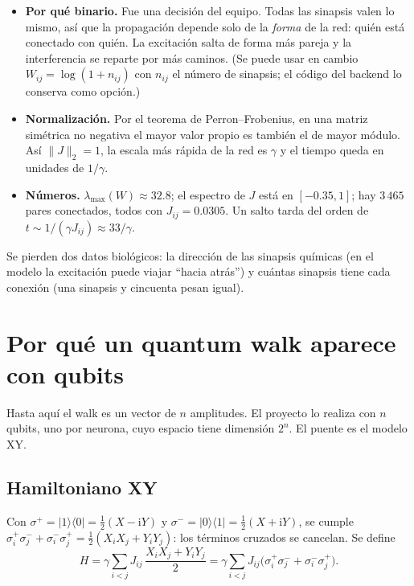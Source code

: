 \documentclass[11pt,a4paper]{article}
\renewcommand{\ket}[1]{\lvert #1\rangle}
\renewcommand{\bra}[1]{\langle #1\rvert}
\newcommand{\ii}{\mathrm{i}}
\theoremstyle{plain}
\theoremstyle{definition}
\theoremstyle{remark}
\begin{document}
\begin{itemize}
\item \textbf{Por qué binario.} Fue una decisión del equipo. Todas las sinapsis valen lo mismo, así que la propagación depende solo de la \emph{forma} de la red: quién está conectado con quién. La excitación salta de forma más pareja y la interferencia se reparte por más caminos. (Se puede usar en cambio $W_{ij}=\log(1+n_{ij})$ con $n_{ij}$ el número de sinapsis; el código del backend lo conserva como opción.)
\item \textbf{Normalización.} Por el teorema de Perron--Frobenius, en una matriz simétrica no negativa el mayor valor propio es también el de mayor módulo. Así $\lVert J\rVert_2=1$, la escala más rápida de la red es $\gamma$ y el tiempo queda en unidades de $1/\gamma$.
\item \textbf{Números.} $\lambda_{\max}(W)\approx32.8$; el espectro de $J$ está en $[-0.35,1]$; hay $3\,465$ pares conectados, todos con $J_{ij}=0.0305$. Un salto tarda del orden de $t\sim1/(\gamma J_{ij})\approx33/\gamma$.
\end{itemize}

\begin{honestidad}
Se pierden dos datos biológicos: la dirección de las sinapsis químicas (en el modelo la excitación puede viajar ``hacia atrás'') y cuántas sinapsis tiene cada conexión (una sinapsis y cincuenta pesan igual).
\end{honestidad}

\section{Por qué un quantum walk aparece con qubits}
\label{sec:qubits}

Hasta aquí el walk es un vector de $n$ amplitudes. El proyecto lo realiza con $n$ qubits, uno por neurona, cuyo espacio tiene dimensión $2^n$. El puente es el modelo XY.

\subsection{Hamiltoniano XY}

Con $\sigma^+=\ket1\!\bra0=\tfrac12(X-\ii Y)$ y $\sigma^-=\ket0\!\bra1=\tfrac12(X+\ii Y)$, se cumple $\sigma_i^+\sigma_j^-+\sigma_i^-\sigma_j^+=\tfrac12(X_iX_j+Y_iY_j)$: los términos cruzados se cancelan. Se define
\begin{equation}
H=\gamma\sum_{i<j}J_{ij}\,\frac{X_iX_j+Y_iY_j}{2}=\gamma\sum_{i<j}J_{ij}\bigl(\sigma_i^+\sigma_j^-+\sigma_i^-\sigma_j^+\bigr).
\label{eq:HXY}
\end{equation}
\end{document}
